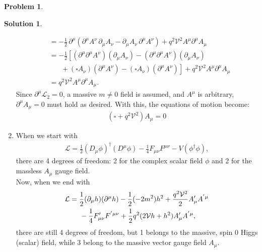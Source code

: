 \documentclass[a4paper,11pt]{article}
\numberwithin{equation}{section}
\theoremstyle{definition}
\newtheorem{prob}{Problem}[section]
\newtheorem{sln}{Solution}[section]
\newcommand{\p}{\partial}
\newcommand{\lag}{\mathcal{L}}
\newcommand{\V}{\mathcal{V}}
\begin{document}
\begin{prob}
\begin{sln}
\begin{enumerate}
\begin{align}
				&= -\frac{1}{2}\,\p^\mu\left(\partial^\mu A^\nu\,\partial_\mu A_\nu - \partial_\mu A_\nu\,\partial^\mu A^\nu \right) + q^2\V^2A^\mu\p^\mu A_\mu\nonumber\\
				&= -\frac{1}{2}\left[(\p^\mu\p^\mu A^\nu)(\p_\mu A_\nu) - (\p^\mu\p^\mu A^\nu)(\p_\mu A_\nu)\right.\nonumber\\
				&\left.\,\,\,\,\,\,\,\,\,\, + (\square A_\nu)( \p^\mu A^\nu) - (\square A_\nu)( \p^\mu A^\nu)   \right] + 
				q^2\V^2A^\mu\p^\mu A_\mu\nonumber\\
				&= q^2\V^2 A^\mu\p^\mu A_\mu.
				\end{align}
				Since $\p^\mu\lag_2 = 0$, a massive $m\neq 0$ field is assumed, and $A^\mu$ is arbitrary, $\p^\mu A_\mu = 0$ must hold as desired. With this, the equations of motion become:
				\begin{align}
				\boxed{\left(\square +  q^2\V^2\right) A_\mu = 0}
				\end{align}
				
				
				
				
				
				\item When we start with 
				\begin{align}
				\lag = \frac{1}{2}(D_\mu\phi)^\dagger(D^\mu\phi) - \frac{1}{4}F_{\mu\nu}F^{\mu\nu} - V(\phi^\dagger\phi),
				\end{align}
				there are 4 degrees of freedom: 2 for the complex scalar field $\phi$ and 2 for the massless $A_\mu$ gauge field. \\
				
				Now, when we end with 
				\begin{align}
				\lag &= \frac{1}{2}(\p_\mu h)(\p^\mu h) - \frac{1}{2}(-2m^2)h^2 + \frac{q^2\V^2}{2}A'_\mu A^{'\mu}\nonumber\\ 
				&\hspace{0.5cm} - \frac{1}{4}F'_{\mu\nu}F^{'\mu\nu} + \frac{1}{2}q^2(2\V h + h^2)A'_\mu A^{'\mu},
				\end{align}
				there are still 4 degrees of freedom, but 1 belongs to the massive, spin 0 Higgs (scalar) field, while 3 belong to the massive vector gauge field $A_\mu$.\\
				
				
			\end{enumerate}
		\end{sln}

	
	
	
	
\end{prob}
\end{document}
